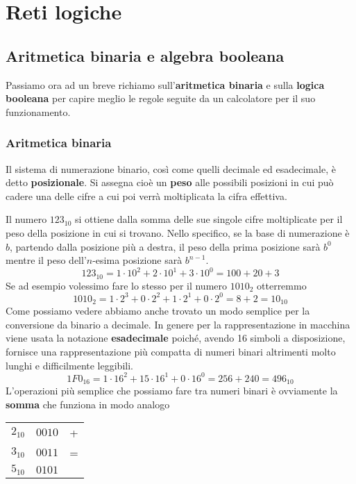 \part{Reti logiche}

\chapter{Aritmetica binaria e algebra booleana}
Passiamo ora ad un breve richiamo sull'\textbf{aritmetica binaria} e sulla \textbf{logica booleana}
per capire meglio le regole seguite da un calcolatore per il suo funzionamento.

\section{Aritmetica binaria}
Il sistema di numerazione binario, così come quelli decimale ed esadecimale, è detto
\textbf{posizionale}. Si assegna cioè un \textbf{peso} alle possibili posizioni in cui può cadere
una delle cifre a cui poi verrà moltiplicata la cifra effettiva.

Il numero $123_{10}$ si ottiene dalla somma delle sue singole cifre moltiplicate per il peso della
posizione in cui si trovano. Nello specifico, se la base di numerazione è $b$, partendo dalla
posizione più a destra, il peso della prima posizione sarà $b^0$ mentre il peso dell'$n$-esima
posizione sarà $b^{n-1}$.
\[ 123_{10} = 1 \cdot 10^2 + 2 \cdot 10^1 + 3 \cdot 10^0 = 100 + 20 + 3 \]
Se ad esempio volessimo fare lo stesso per il numero $1010_2$ otterremmo
\[ 1010_2 = 1 \cdot 2^3 + 0 \cdot 2^2 + 1 \cdot 2^1 + 0 \cdot 2^0 = 8 + 2 = 10_{10} \]
Come possiamo vedere abbiamo anche trovato un modo semplice per la conversione da binario a
decimale. In genere per la rappresentazione in macchina viene usata la notazione
\textbf{esadecimale} poiché, avendo 16 simboli a disposizione, fornisce una rappresentazione più
compatta di numeri binari altrimenti molto lunghi e difficilmente leggibili.
\[ 1F0_{16} = 1 \cdot 16^2 + 15 \cdot 16^1 + 0 \cdot 16^0 = 256 + 240 = 496_{10} \]
L'operazioni più semplice che possiamo fare tra numeri binari è ovviamente la \textbf{somma} che
funziona in modo analogo
\begin{center}
	\begin{tabular}{c | c c}
		$2_{10}$ & $0010$ & + \\
		$3_{10}$ & $0011$ & = \\ \hline
		$5_{10}$ & $0101$
	\end{tabular}
\end{center}

